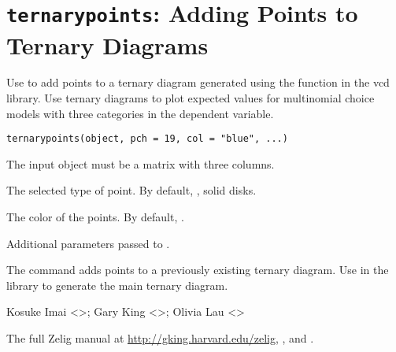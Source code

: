  \section{{\tt ternarypoints}: Adding Points to Ternary Diagrams}\label{ss:ternarypoints}
\begin{Description}\relax
Use  to add points to a ternary diagram generated
using the  function in the vcd library.  Use
ternary diagrams to plot expected values for multinomial choice models
with three categories in the dependent variable.
\end{Description}
\begin{Usage}
\begin{verbatim}
ternarypoints(object, pch = 19, col = "blue", ...)
\end{verbatim}
\end{Usage}
\begin{Arguments}
\begin{ldescription}
\item[\code{object}] The input object must be a matrix with three
columns. 
\item[\code{pch}] The selected type of point.  By default, , solid disks. 
\item[\code{col}] The color of the points.  By default, . 
\item[\code{...}] Additional parameters passed to . 
\end{ldescription}
\end{Arguments}
\begin{Value}
The  command adds points to a previously existing
ternary diagram.  Use  in the  library to
generate the main ternary diagram.
\end{Value}
\begin{Author}\relax
Kosuke Imai <>; Gary King
<>; Olivia Lau <>
\end{Author}
\begin{SeeAlso}\relax
The full Zelig manual at
\url{http://gking.harvard.edu/zelig}, , and
.
\end{SeeAlso}


